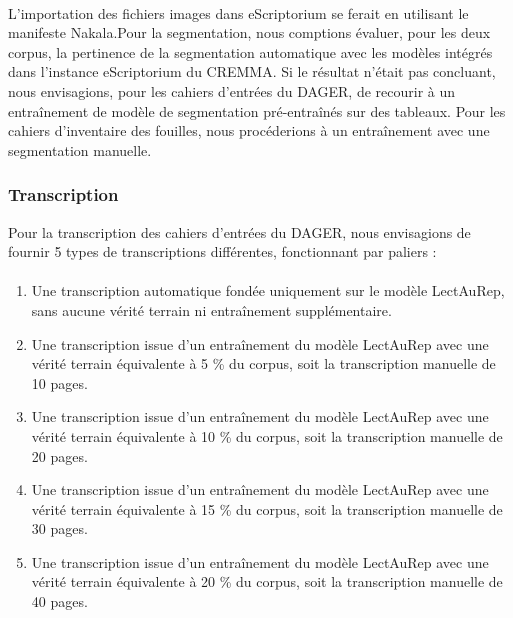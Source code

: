 \documentclass[a4paper,12pt,twoside]{book}
\begin{document}
\paragraph{}
L’importation des fichiers images dans eScriptorium se ferait en utilisant le manifeste Nakala.Pour la segmentation, nous comptions évaluer, pour les deux corpus, la pertinence de la segmentation automatique avec les modèles intégrés dans l’instance eScriptorium du CREMMA. Si le résultat n’était pas concluant, nous envisagions, pour les cahiers d'entrées du DAGER, de recourir à un entraînement de modèle de segmentation  pré-entraînés sur des tableaux. Pour les cahiers d’inventaire des fouilles, nous procéderions à un entraînement avec une segmentation manuelle.

\subsubsection{Transcription}
Pour la transcription des cahiers d’entrées du DAGER, nous envisagions de fournir 5 types de transcriptions différentes, fonctionnant par paliers :

\paragraph{}
\begin{enumerate}
	\item Une transcription automatique fondée uniquement sur le modèle LectAuRep, sans aucune vérité terrain ni entraînement supplémentaire.
	\item Une transcription issue d’un entraînement du modèle LectAuRep avec une vérité terrain équivalente à 5 \% du corpus, soit la transcription manuelle de 10 pages.
	\item Une transcription issue d’un entraînement du modèle LectAuRep avec une vérité terrain équivalente à 10 \% du corpus, soit la transcription manuelle de 20 pages.
	\item Une transcription issue d’un entraînement du modèle LectAuRep avec une vérité terrain équivalente à 15 \% du corpus, soit la transcription manuelle de 30 pages.
	\item Une transcription issue d’un entraînement du modèle LectAuRep avec une vérité terrain équivalente à 20 \% du corpus, soit la transcription manuelle de 40 pages.
\end{enumerate}
\end{document}
